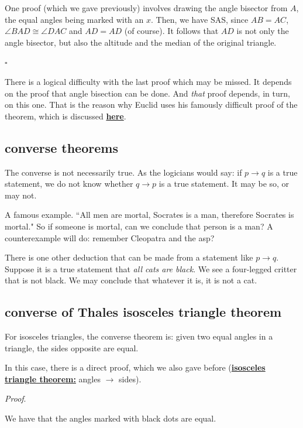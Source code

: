 \documentclass[11pt, oneside]{article}
\begin{document}
One proof (which we gave previously) involves drawing the angle bisector from $A$, the equal angles being marked with an $x$.  Then, we have SAS, since $AB = AC$, $\angle BAD \cong \angle DAC$ and $AD = AD$ (of course).  It follows that $AD$ is not only the angle bisector, but also the altitude and the median of the original triangle.

$\square$

There is a logical difficulty with the last proof which may be missed.  It depends on the proof that angle bisection can be done.  And \emph{that} proof depends, in turn, on this one.  That is the reason why Euclid uses his famously difficult proof of the theorem, which is discussed \hyperref[sec:Euclid_I_5]{\textbf{here}}.

\subsection*{converse theorems}

The converse is not necessarily true.  As the logicians would say:  if $p \rightarrow q$ is a true statement, we do not know whether $q \rightarrow p$ is a true statement.  It may be so, or may not.

A famous example.  ``All men are mortal, Socrates is a man, therefore Socrates is mortal."  So if someone is mortal, can we conclude that person is a man?  A counterexample will do:  remember Cleopatra and the asp?

There is one other deduction that can be made from a statement like $p \rightarrow q$.  Suppose it is a true statement that \emph{all cats are black}.  We see a four-legged critter that is not black.  We may conclude that whatever it is, it is not a cat.

\subsection*{converse of Thales isosceles triangle theorem}

For isosceles triangles, the converse theorem is:  given two equal angles in a triangle, the sides opposite are equal.

In this case, there is a direct proof, which we also gave before (\hyperref[sec:isosceles_converse]{\textbf{isosceles triangle theorem:}}  angles $\rightarrow$ sides).

\emph{Proof}.

We have that the angles marked with black dots are equal. 
\end{document}

